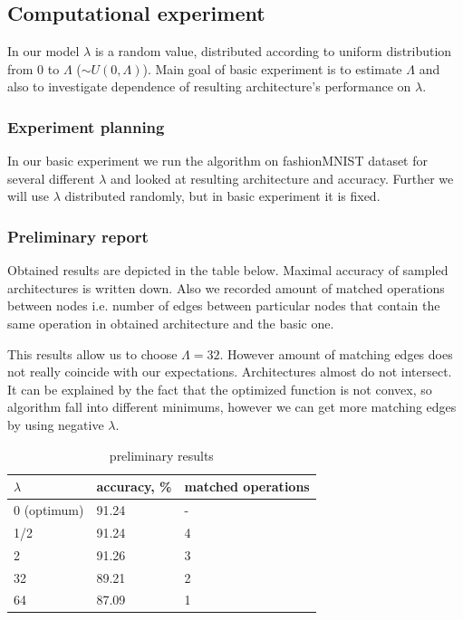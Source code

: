 \documentclass{article}
\begin{document}
\subsection{Computational experiment}

In our model $\lambda$ is a random value, distributed according to uniform distribution from 0 to $\Lambda$ ($\sim U(0, \Lambda)$). Main goal of basic experiment is to estimate $\Lambda$ and also to investigate dependence of resulting architecture's performance on $\lambda$.

\subsubsection{Experiment planning}

In our basic experiment we run the algorithm on fashionMNIST dataset for several different $\lambda$ and looked at resulting architecture and accuracy. Further we will use $\lambda$ distributed randomly, but in basic experiment it is fixed.

\subsubsection{Preliminary report}

Obtained results are depicted in the table below. Maximal accuracy of sampled architectures is written down. Also we recorded amount of matched operations between nodes i.e. number of edges between particular nodes that contain the same operation in obtained architecture and the basic one.

This results allow us to choose $\Lambda = 32$. However amount of matching edges does not really coincide with our expectations. Architectures almost do not intersect. It can be explained by the fact that the optimized function is not convex, so algorithm fall into different minimums, however we can get more matching edges by using negative $\lambda$. 

\begin{table}[h   ]
	\caption{preliminary results}
	\centering
	\begin{tabular}{lll}

		\midrule
		$\lambda$     & accuracy, \% & matched operations \\
		\midrule
        0 (optimum) & 91.24 & - \\ 
        1/2  & 91.24 &  4   \\
		2  & 91.26   &  3   \\
		32 & 89.21   &  2   \\
		64 & 87.09   &  1   \\
		\bottomrule
	\end{tabular}
	\label{tab:table}
\end{table}
\end{document}

